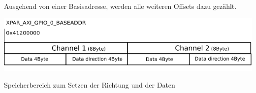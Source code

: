 Ausgehend von einer Basisadresse, werden alle weiteren Offsets dazu gezählt.\\

\begin{minipage}{\textwidth}
    \begin{center}        
        \includegraphics[scale=0.9]{img/baseaddr.png} 
    \end{center}
\end{minipage}
\begin{center}
Speicherbereich zum Setzen der Richtung und der Daten
\end{center}





